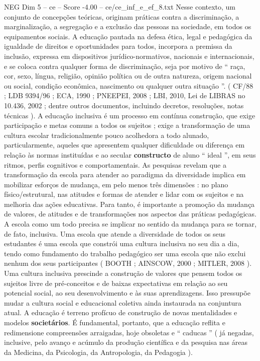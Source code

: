 \begin{textsample}{NEG Dim 5 – ce – Score -4.00 – ce/ce\_inf\_e\_ef\_8.txt}
Nesse contexto, um conjunto de concepções teóricas, originam práticas contra a discriminação, a marginalização, a segregação e a exclusão das pessoas na sociedade, em todos os equipamentos sociais.
A educação pautada na defesa ética, legal e pedagógica da igualdade de direitos e oportunidades para todos, incorpora a premissa da inclusão, expressa em dispositivos jurídico-normativos, nacionais e internacionais, e se coloca contra qualquer forma de discriminação, seja por motivo de “ raça, cor, sexo, língua, religião, opinião política ou de outra natureza, origem nacional ou social, condição econômica, nascimento ou qualquer outra situação ”. ( CF/88 ; LDB 9394/96 ; ECA, 1990 ; PNEEPEI, 2008 ; LBI, 2010, Lei de LIBRAS no 10.436, 2002 ; dentre outros documentos, incluindo decretos, resoluções, notas técnicas ).
A educação inclusiva é um processo em contínua construção, que exige participação e metas comuns a todos os sujeitos ; exige a transformação de uma cultura escolar tradicionalmente pouco acolhedora a todo alunado, particularmente, aqueles que apresentem qualquer dificuldade ou diferença em relação às normas instituídas e ao secular \textbf{constructo} de aluno “ ideal ”, em seus ritmos, perfis cognitivos e comportamentais.
As pesquisas revelam que a transformação da escola para atender ao paradigma da diversidade implica em mobilizar esforços de mudança, em pelo menos três dimensões : no plano físico/estrutural, nas atitudes e formas de atender e lidar com os sujeitos e na melhoria das ações educativas.
Para tanto, é importante a promoção da mudança de valores, de atitudes e de transformações nos aspectos das práticas pedagógicas.
A escola como um todo precisa se implicar no sentido da mudança para se tornar, de fato, inclusiva.
Uma escola que atende a diversidade de todos os seus estudantes é uma escola que constrói uma cultura inclusiva no seu dia a dia, tendo como fundamento do trabalho pedagógico ser uma escola que não exclui nenhum dos seus participantes ( BOOTH ; AINSCOW, 2000 ; MITLER, 2008 ).
Uma cultura inclusiva prescinde a construção de valores que pensem todos os sujeitos livre de pré-conceitos e de baixas expectativas em relação ao seu potencial social, ao seu desenvolvimento e às suas aprendizagens.
Isso pressupõe mudar a cultura social e educacional coletiva ainda instaurada na conjuntura atual.
A educação é terreno profícuo de construção de novas mentalidades e modelos \textbf{societários}.
É fundamental, portanto, que a educação reflita e redimensione compreensões arraigadas, hoje obsoletas e “ caducas ” ( já negadas, inclusive, pelo avanço e acúmulo da produção científica e da pesquisa nas áreas da Medicina, da Psicologia, da Antropologia, da Pedagogia ).

\end{textsample}
